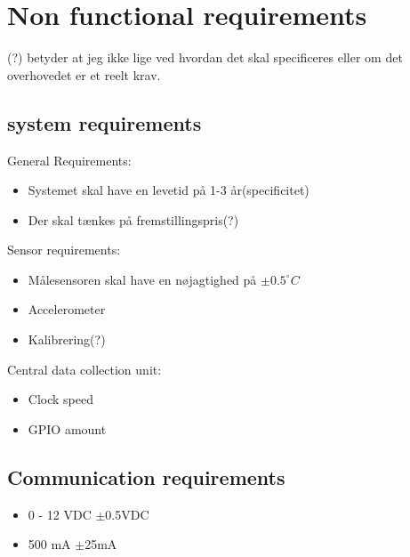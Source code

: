 \section{Non functional requirements}
(?) betyder at jeg ikke lige ved hvordan det skal specificeres eller om det overhovedet er et reelt krav.\\
\subsection{system requirements }
General Requirements:\\
\begin{itemize}
\item Systemet skal have en levetid på 1-3 år(specificitet)
\item Der skal tænkes på fremstillingspris(?)
\end{itemize}
Sensor requirements:\\
\begin{itemize}
\item Målesensoren skal have en nøjagtighed på $\pm0.5 ^{\circ}C$
\item Accelerometer
\item Kalibrering(?)
\end{itemize}
Central data collection unit:\\
\begin{itemize}
\item Clock speed
\item GPIO amount
\end{itemize}


\subsection{Communication requirements}
\begin{itemize}
\item 0 - 12 VDC $\pm$0.5VDC
\item 500 mA $\pm$25mA
\end{itemize}


